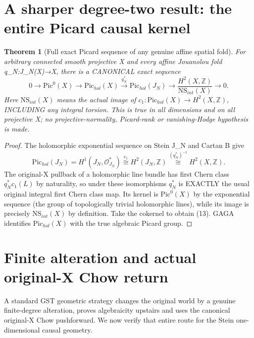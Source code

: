 \documentclass[11pt]{article}
\newtheorem{theorem}{Theorem}
\begin{document}
\section{A sharper degree-two result: the entire Picard causal kernel}

\begin{theorem}[Full exact Picard sequence of any genuine affine spatial fold]
For arbitrary connected smooth projective X
and every affine Jouanolou fold q_N:J_N(X)→X,
there is a CANONICAL exact sequence
\[
 \boxed{
 0\to\mathrm{Pic}^0(X)
   \to\mathrm{Pic}_{hol}(X)
   \overset{q_N^*}{\longrightarrow}
      \mathrm{Pic}_{hol}(J_N)
   \longrightarrow
   \frac{H^2(X,\mathbb Z)}
        {\mathrm{NS}_{int}(X)}
   \to0.
 }                                                        \tag{13}
\]
Here $\mathrm{NS}_{int}(X)$ means the actual
image of $c_1:\mathrm{Pic}_{hol}(X)\to
H^2(X,\mathbb Z)$, INCLUDING any integral torsion.
This is true in all dimensions and on
all projective X; no projective-normality,
Picard-rank or vanishing-Hodge hypothesis is made.
\end{theorem}
\begin{proof}
The holomorphic exponential sequence on Stein J_N
and Cartan B give
\[
 \mathrm{Pic}_{hol}(J_N)
 =H^1(J_N,\mathcal O^*_{J_N})
 \overset{c_1}\cong H^2(J_N,\mathbb Z)
 \overset{(q_N^*)^{-1}}\cong H^2(X,\mathbb Z).
\]
The original-X pullback of a holomorphic
line bundle has first Chern class
$q_N^*c_1(L)$ by naturality,
so under these isomorphisms $q_N^*$
is EXACTLY the usual original
integral first Chern class map.
Its kernel is
$\mathrm{Pic}^0(X)$ by the exponential
sequence (the group of topologically
trivial holomorphic lines), while its
image is precisely $\mathrm{NS}_{int}(X)$
by definition. Take the cokernel to
obtain (13). GAGA identifies
$\mathrm{Pic}_{hol}(X)$ with the true
algebraic Picard group.
\end{proof}

\section{Finite alteration and actual original-X Chow return}

A standard GST geometric strategy changes the
original world by a genuine finite-degree
alteration, proves algebraicity upstairs and
uses the canonical original-X Chow pushforward.
We now verify that entire route for the
Stein one-dimensional causal geometry.
\end{document}
